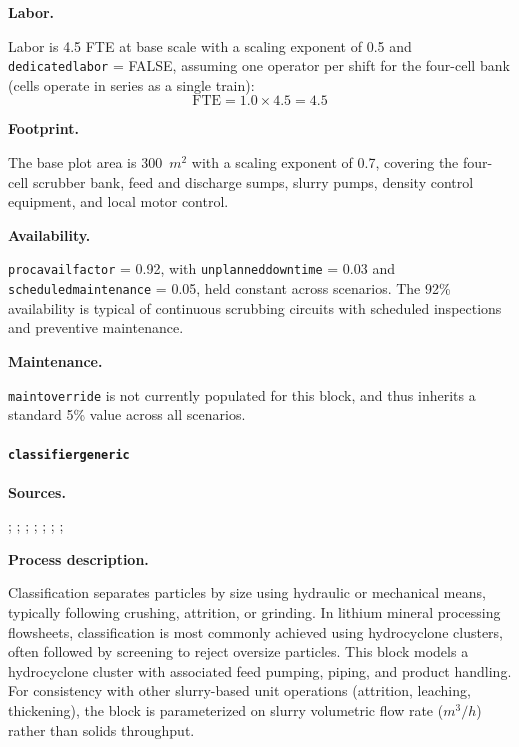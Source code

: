 \documentclass{article}
\renewcommand\_{\textunderscore\allowbreak}
\begin{document}
\medskip
\noindent\textbf{Labor.}\quad

Labor is 4.5 FTE at base scale with a scaling exponent of 0.5 and \texttt{dedicated\_labor} = FALSE, assuming one operator per shift for the four-cell bank (cells operate in series as a single train):
\[
	\text{FTE} = 1.0 \times 4.5 = 4.5
\]

\medskip
\noindent\textbf{Footprint.}\quad

The base plot area is 300~$\si{m^2}$ with a scaling exponent of 0.7, covering the four-cell scrubber bank, feed and discharge sumps, slurry pumps, density control equipment, and local motor control.


\medskip
\noindent\textbf{Availability.}\quad

\texttt{proc\_avail\_factor} = 0.92, with \texttt{unplanned\_downtime} = 0.03 and \texttt{scheduled\_maintenance} = 0.05, held constant across scenarios. The 92\% availability is typical of continuous scrubbing circuits with scheduled inspections and preventive maintenance.

\medskip
\noindent\textbf{Maintenance.}\quad

\texttt{maint\_override} is not currently populated for this block, and thus inherits a standard 5\% value across all scenarios.

\clearpage
\paragraph{\texttt{classifier\_generic}}\label{app:04-methods-blockdefs-classifier}\leavevmode\par

\medskip
\noindent\textbf{Sources.}\quad

\citet{flsmidthKREBSGMAXMolded2024}; \citet{ausimmMonograph27Cost}; \citet{metso:outotecBasicsMineralsProcessing2024}; \citet{sgscanadaincSK1300Technical2024}; \citet{riordanTonopahLithiumClaims2023}; \citet{laneNI43101Technical2024}; \citet{nationalrenewableenergylaboratorynrelgoldencoImprovingPumpingSystem2006}; \citet{zhangInnovativeRecoveryLepidolite2025}

\medskip
\noindent\textbf{Process description.}\quad

Classification separates particles by size using hydraulic or mechanical means, typically following crushing, attrition, or grinding. In lithium mineral processing flowsheets, classification is most commonly achieved using hydrocyclone clusters, often followed by screening to reject oversize particles. This block models a hydrocyclone cluster with associated feed pumping, piping, and product handling. For consistency with other slurry-based unit operations (attrition, leaching, thickening), the block is parameterized on slurry volumetric flow rate ($\si{m^3/h}$) rather than solids throughput.
\end{document}
